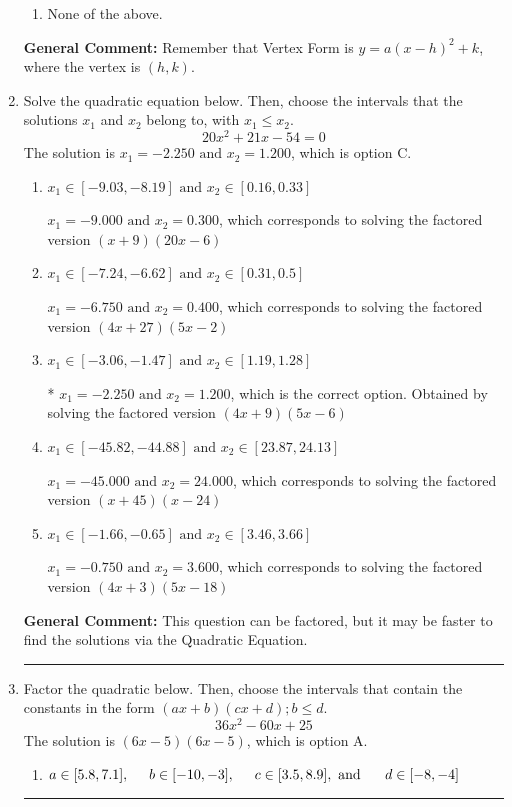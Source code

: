 \documentclass{extbook}[14pt]
\newcommand{\litem}[1]{\item #1

\rule{\textwidth}{0.4pt}}
\begin{document}
\begin{enumerate}
{\begin{enumerate}[label=\Alph*.]
\begin{multicols}{2}
\end{multicols}\item None of the above.\end{enumerate}
\textbf{General Comment:} Remember that Vertex Form is $y = a(x-h)^2+k$, where the vertex is $(h, k)$.
}
\litem{
Solve the quadratic equation below. Then, choose the intervals that the solutions $x_1$ and $x_2$ belong to, with $x_1 \leq x_2$.
\[ 20x^{2} +21 x -54 = 0 \]The solution is \( x_1 = -2.250 \text{ and } x_2 = 1.200 \), which is option C.\begin{enumerate}[label=\Alph*.]
\item \( x_1 \in [-9.03, -8.19] \text{ and } x_2 \in [0.16, 0.33] \)

$x_1 = -9.000 \text{ and } x_2 = 0.300$, which corresponds to solving the factored version $(x + 9)(20x -6)$
\item \( x_1 \in [-7.24, -6.62] \text{ and } x_2 \in [0.31, 0.5] \)

$x_1 = -6.750 \text{ and } x_2 = 0.400$, which corresponds to solving the factored version $(4x + 27)(5x -2)$
\item \( x_1 \in [-3.06, -1.47] \text{ and } x_2 \in [1.19, 1.28] \)

* $x_1 = -2.250 \text{ and } x_2 = 1.200$, which is the correct option. Obtained by solving the factored version $(4x + 9)(5x -6)$
\item \( x_1 \in [-45.82, -44.88] \text{ and } x_2 \in [23.87, 24.13] \)

$x_1 = -45.000 \text{ and } x_2 = 24.000$, which corresponds to solving the factored version $(x + 45)(x -24)$
\item \( x_1 \in [-1.66, -0.65] \text{ and } x_2 \in [3.46, 3.66] \)

$x_1 = -0.750 \text{ and } x_2 = 3.600$, which corresponds to solving the factored version $(4x + 3)(5x -18)$
\end{enumerate}

\textbf{General Comment:} This question can be factored, but it may be faster to find the solutions via the Quadratic Equation.
}
\litem{
Factor the quadratic below. Then, choose the intervals that contain the constants in the form $(ax+b)(cx+d); b \leq d.$
\[ 36x^{2} -60 x + 25 \]The solution is \( (6x -5)(6x -5) \), which is option A.\begin{enumerate}[label=\Alph*.]
\item \( a \in [5.8, 7.1], \hspace*{5mm} b \in [-10, -3], \hspace*{5mm} c \in [3.5, 8.9], \text{ and } \hspace*{5mm} d \in [-8, -4] \)


\end{enumerate}}
\end{enumerate}
\end{document}
